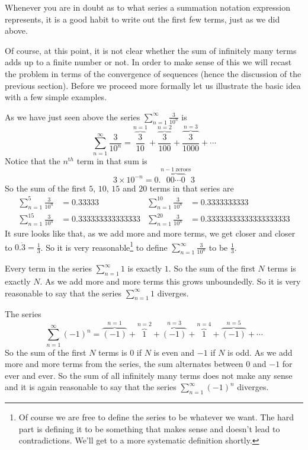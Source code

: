 Whenever you are in doubt as to what series a summation notation expression represents, it is a good habit to write out the first few terms, just as
we did above.

\medskip

Of course, at this point, it is not clear whether the sum of infinitely
many terms adds up to a finite number or not. In order to make sense
of this we will recast the problem in terms of the convergence of
sequences (hence the discussion of the previous section). Before we
proceed more formally let us illustrate the basic idea with a few
simple examples.
\begin{eg}[$\ds \sum_{n=1}^\infty\frac{3}{10^n}$]\label{eg:SRprelimSumA}
As we have just seen above the series $\sum_{n=1}^\infty\frac{3}{10^n}$
is
\begin{equation*}
\sum_{n=1}^\infty\frac{3}{10^n}
 = \overbrace{\frac{3}{10}}^{n=1}
    +\overbrace{\frac{3}{100}}^{n=2}
    +\overbrace{\frac{3}{1000}}^{n=3}+\cdots
\end{equation*}
Notice that the $n^{\mathrm th}$ term in that sum is
\begin{equation*}
3\times 10^{-n} = 0.\!\!\overbrace{00\cdots 0}^{n-1\ \mathrm{zeroes}}\!3
\end{equation*}
So the sum of the first $5$, $10$, $15$ and $20$ terms in that series
are
\begin{align*}
\sum_{n=1}^5\frac{3}{10^n} &= 0.33333 &
\sum_{n=1}^{10}\frac{3}{10^n} &= 0.3333333333 \\
\sum_{n=1}^{15}\frac{3}{10^n} &= 0.333333333333333 &
\sum_{n=1}^{20}\frac{3}{10^n} &= 0.33333333333333333333
\end{align*}
It sure looks like that, as we add more and more terms, we get
closer and closer to $0.\dot 3=\frac{1}{3}$.
So it is very reasonable\footnote{Of course we are free to define
the series to be whatever we want. The hard part is
defining it to be something that makes sense and doesn't lead to contradictions. We'll get to a more systematic definition shortly.}
to define $\sum_{n=1}^\infty\frac{3}{10^n}$ to be $\frac{1}{3}$.
\end{eg}

\begin{eg}[$\ds \sum_{n=1}^\infty 1$ and $\sum_{n=1}^\infty (-1)^n$] \label{eg:SRprelimSumB}
Every term in the series $\sum_{n=1}^\infty 1$ is exactly $1$. So the sum of the first $N$ terms is exactly $N$. As we
add more and more terms this grows unboundedly. So it is very reasonable to say that the series  $\sum_{n=1}^\infty 1$
diverges.

The series
\begin{equation*}
\sum_{n=1}^\infty (-1)^n
=\overbrace{(-1)}^{n=1}
 +\overbrace{1}^{n=2}
 +\overbrace{(-1)}^{n=3}
 +\overbrace{1}^{n=4}
 +\overbrace{(-1)}^{n=5}+\cdots
\end{equation*}
So the sum of the first $N$ terms is $0$ if $N$ is even and $-1$ if $N$ is odd. As we add more and more terms from the
series, the sum alternates between $0$ and $-1$ for ever and ever. So the sum of all infinitely many terms does not make
any sense and it is again reasonable to say that the series  $\sum_{n=1}^\infty(-1)^n$ diverges.
\end{eg}

